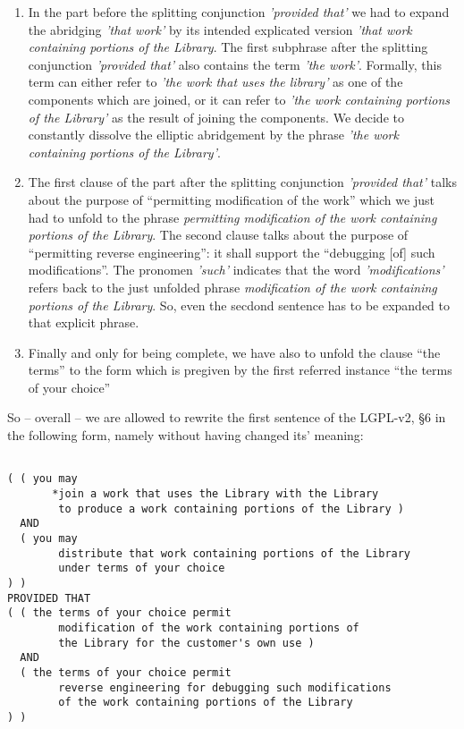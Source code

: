 \begin{enumerate}
  \item  In the part before the splitting conjunction \emph{'provided that'} we
  had to expand the abridging \emph{'that work'} by its intended explicated
  version \emph{'that work containing portions of the Library}. The first
  subphrase after the splitting conjunction \emph{'provided that'} also contains
  the term \emph{'the work'}. Formally, this term can either refer to \emph{'the
  work that uses the library'} as one of the components which are joined, or it
  can refer to \emph{'the work containing portions of the Library'} as the
  result of joining the components. We decide to constantly dissolve the
  elliptic abridgement by the phrase \emph{'the work containing portions of the
  Library'}.
  \item The first clause of the part after the splitting conjunction
  \emph{'provided that'} talks about the purpose of \enquote{permitting
  modification of the work} which we just had to unfold to the phrase
  \emph{permitting modification of the work containing portions of the Library}.
  The second clause talks about the purpose of \enquote{permitting reverse
  engineering}: it shall support the \enquote{debugging [of] such
  modifications}. The pronomen \emph{'such'} indicates that the word
  \emph{'modifications'} refers back to the just unfolded phrase
  \emph{modification of the work containing portions of the Library}. So, even
  the secdond sentence has to be expanded to that explicit phrase.
  \item Finally and only for being complete, we have also to unfold the clause
  \enquote{the terms} to the form which is pregiven by the first referred
  instance \enquote{the terms of your choice}
\end{enumerate}

So -- overall -- we are allowed to rewrite the first sentence of the LGPL-v2, §6
in the following form, namely without having changed its' meaning:

\begin{verbatim}

( ( you may 
       *join a work that uses the Library with the Library
        to produce a work containing portions of the Library )
  AND 
  ( you may 
        distribute that work containing portions of the Library
        under terms of your choice 
) )
PROVIDED THAT
( ( the terms of your choice permit 
        modification of the work containing portions of 
        the Library for the customer's own use )
  AND
  ( the terms of your choice permit
        reverse engineering for debugging such modifications 
        of the work containing portions of the Library   
) )
\end{verbatim}

